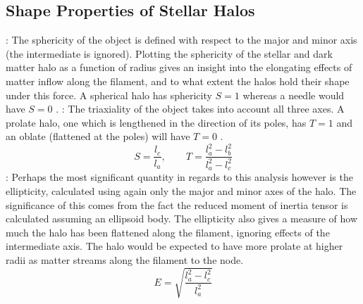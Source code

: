\documentclass[journal]{IEEEtran}
\begin{document}
\subsection{Shape Properties of Stellar Halos}
: The sphericity of the object is defined with respect to the major and minor axis (the intermediate is ignored). Plotting the sphericity of the stellar and dark matter halo as a function of radius gives an insight into the elongating effects of matter inflow along the filament, and to what extent the halos hold their shape under this force. A spherical halo has sphericity $S=1$ whereas a needle would have $S=0$ \cite{hahn07a}.
: The triaxiality of the object takes into account all three axes. A prolate halo, one which is lengthened in the direction of its poles, has $T=1$ and an oblate (flattened at the poles) will have $T=0$ \cite{hahn07a}.
\begin{equation}
	S=\frac{l_c}{l_a}, \quad \quad T=\frac{l_a^2-l_b^2}{l_a^2-l_c^2}
	\label{eq:sph&tri}
\end{equation}
: Perhaps the most significant quantity in regards to this analysis however is the ellipticity, calculated using again only the major and minor axes of the halo. The significance of this comes from the fact the reduced moment of inertia tensor is calculated assuming an ellipsoid body. The ellipticity also gives a measure of how much the halo has been flattened along the filament, ignoring effects of the intermediate axis. The halo would be expected to have more prolate at higher radii as matter streams along the filament to the node.
\begin{equation}
	E=\sqrt{\frac{l_a^2-l_c^2}{l_a^2}}
	\label{eq:ellipticity}
\end{equation}
\end{document}
